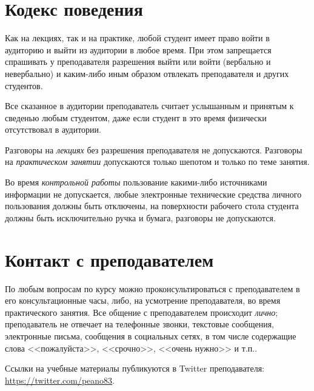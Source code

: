 \documentclass{article}
\begin{document}
\section{Кодекс поведения}

Как на лекциях, так и на практике, любой студент имеет право войти в аудиторию и выйти из аудитории в любое время. При этом запрещается спрашивать у преподавателя разрешения выйти или войти (вербально и невербально) и каким-либо иным образом отвлекать преподавателя и других студентов.

Все сказанное в аудитории преподаватель считает услышанным и принятым к сведенью любым студентом, даже если студент в это время физически отсутствовал в аудитории.

Разговоры на {\em лекциях} без разрешения преподавателя не допускаются.
Разговоры на {\em практическом занятии} допускаются только шепотом и только по теме занятия.

Во время {\em контрольной работы} пользование какими-либо источниками информации не допускается, любые электронные технические средства личного пользования должны быть отключены, на поверхности рабочего стола студента должны быть исключительно ручка и бумага, разговоры не допускаются.


\section{Контакт с преподавателем}

По любым вопросам по курсу можно проконсультироваться с преподавателем в его консультационные часы, либо, на усмотрение преподавателя, во время практического занятия. Все общение с преподавателем происходит {\em лично}; преподаватель не отвечает на телефонные звонки, текстовые сообщения, электронные письма, сообщения в социальных сетях, в том числе содержащие слова <<пожалуйста>>, <<срочно>>, <<очень нужно>> и т.п..

Ссылки на учебные материалы публикуются в Twitter преподавателя: \url{https://twitter.com/peano83}.
\end{document}
